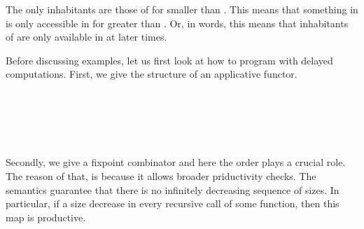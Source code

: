 The only inhabitants    are those of   for  smaller than .
This means that something in   is only accessible in    for  greater than .
Or, in words, this means that inhabitants of  are only available in   at later times.

Before discussing examples, let us first look at how to program with delayed computations.
First, we give  the structure of an applicative functor.

\begin{code}%
\>[0]\AgdaSpace{}%
\AgdaSymbol{:}\AgdaSpace{}%
\AgdaSymbol{\{}\AgdaSpace{}%
\AgdaSymbol{:}\AgdaSpace{}%
\AgdaSymbol{\}}\AgdaSpace{}%
\AgdaSpace{}%
\AgdaSpace{}%
\AgdaSpace{}%
\AgdaSpace{}%
\AgdaSymbol{(}\AgdaSpace{}%
\AgdaSymbol{)}\<%
\\
\>[0]\AgdaSpace{}%
\AgdaSymbol{(}\AgdaSpace{}%
\AgdaSymbol{)}\AgdaSpace{}%
\AgdaSymbol{=}\AgdaSpace{}%
\<%
\\
%
\\[\AgdaEmptyExtraSkip]%
\>[0]\AgdaSpace{}%
\AgdaSymbol{:}\AgdaSpace{}%
\AgdaSymbol{\{}\AgdaSpace{}%
\AgdaSpace{}%
\AgdaSymbol{:}\AgdaSpace{}%
\AgdaSymbol{\}}\AgdaSpace{}%
\AgdaSpace{}%
\AgdaSymbol{(}\AgdaSymbol{(}\AgdaSpace{}%
\AgdaSpace{}%
\AgdaSymbol{)}\AgdaSpace{}%
\AgdaSpace{}%
\AgdaSpace{}%
\AgdaSpace{}%
\AgdaSpace{}%
\AgdaSpace{}%
\AgdaSymbol{)}\<%
\\
\>[0]\AgdaSpace{}%
\AgdaSymbol{(}\AgdaSpace{}%
\AgdaSpace{}%
\AgdaSymbol{)}\AgdaSpace{}%
\AgdaSymbol{=}\AgdaSpace{}%
\AgdaSpace{}%
\AgdaSpace{}%
\AgdaSymbol{(}\AgdaSpace{}%
\AgdaSymbol{)}\<%
\end{code}

Secondly, we give a fixpoint combinator and here the order plays a crucial role.
The reason of that, is because it allows broader priductivity checks.
The semantics guarantee that there is no infinitely decreasing sequence of sizes.
In particular, if a size decrease in every recursive call of some function, then this map is productive.

